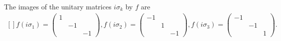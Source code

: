 \begin{lemma}       \label{LEMooSYGUooVWxGYX}
    The images of the unitary matrices \( i\sigma_k\) by \( f\) are
    \begin{equation}
        \begin{aligned}[]
            f(i\sigma_1)=\begin{pmatrix}
                1    &       &       \\
                    &   -1    &       \\
                    &       &   -1
            \end{pmatrix},
            f(i\sigma_2)=\begin{pmatrix}
                -1    &       &       \\
                    &   1    &       \\
                    &       &   -1
            \end{pmatrix},
            f(i\sigma_3)=\begin{pmatrix}
               -1     &       &       \\
                    &   -1    &       \\
                    &       &   1
            \end{pmatrix}.
        \end{aligned}
    \end{equation}
\end{lemma}

